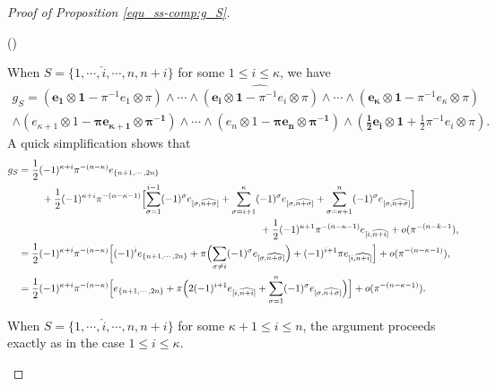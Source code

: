 \documentclass[pdflatex,sn-mathphys-num]{sn-jnl}%
\theoremstyle{thmstyleone}%
\theoremstyle{thmstyletwo}%
\numberwithin{equation}{subsection}
\theoremstyle{thmstylethree}%
\newcommand{\wh}{\widehat}
\newenvironment{altenumerate}
	{\begin{list}
			{(\theenumi) }
			{\usecounter{enumi}
				\setlength{\labelwidth}{0pt}
				\setlength{\labelsep}{0pt}
				\setlength{\leftmargin}{0pt}
				\setlength{\itemsep}{\the\smallskipamount}
				\renewcommand{\theenumi}{\roman{enumi}}
		}}
		{\end{list}}
\begin{document}
\begin{proof}[Proof of Proposition \ref{equ_ss-comp:g_S}]
\begin{altenumerate}
	\item When $S=\{1,\cdots,\wh{i},\cdots,n,n+i\}$ for some $1\leq i\leq \kappa$, we have
\begin{multline*}
g_S=(\mathbf{e_1\otimes 1}-\pi^{-1}e_1\otimes \pi)\wedge\cdots\wedge \wh{(\mathbf{e_i\otimes 1}-\pi^{-1}e_i\otimes \pi)}\wedge\cdots\wedge(\mathbf{e_\kappa\otimes 1}-\pi^{-1}e_\kappa\otimes \pi)\\
\wedge(e_{\kappa+1}\otimes 1-\mathbf{\pi e_{\kappa+1}\otimes \pi^{-1}})\wedge\cdots\wedge(e_n\otimes 1-\mathbf{\pi e_n\otimes \pi^{-1}})\wedge (\mathbf{\frac{1}{2}e_i\otimes 1}+\frac{1}{2}\pi^{-1}e_i\otimes \pi).
\end{multline*}
 A quick simplification shows that 
	\begin{align*}
		g_S={}   &\frac{1}{2}(-1)^{\kappa+i}\pi^{-(n-\kappa)}e_{\{n+1,\cdots,2n\}}\\
		&\quad+\frac{1}{2}(-1)^{\kappa+i}\pi^{-(n-\kappa-1)}\Bigl[\sum_{\sigma=1}^{i-1}(-1)^{\sigma}e_{[\sigma,\wh{n+\sigma}]}+\sum_{\sigma=i+1}^{\kappa}(-1)^{\sigma}e_{[\sigma,\wh{n+\sigma}]}+\sum_{\sigma=\kappa+1}^{n}(-1)^{\sigma}e_{[\sigma,\wh{n+\sigma}]}\Bigr]\\
		&\hspace{8cm}
		+\frac{1}{2}(-1)^{\kappa+1}\pi^{-(n-\kappa-1)}e_{[i,\wh{n+i}]}+o(\pi^{-(n-k-1}),\\
        ={}&
        \frac{1}{2}(-1)^{\kappa+i}\pi^{-(n-\kappa)}\Bigl[
        (-1)^ie_{\{n+1,\cdots,2n\}}+\pi\Bigl(\sum_{\sigma\neq i}(-1)^\sigma e_{[\sigma,\wh{n+\sigma}]}\Bigr)+(-1)^{i+1}\pi e_{[i,\wh{n+i}]}
        \Bigr]+o(\pi^{-(n-\kappa-1)}),\\
        ={}&\frac{1}{2}(-1)^{\kappa+i}\pi^{-(n-\kappa)}\Bigl[
        e_{\{n+1,\cdots,2n\}}+\pi\Bigl(
        2(-1)^{i+1}e_{[i,\wh{n+i}]}+\sum_{\sigma=1}^n(-1)^\sigma e_{[\sigma,\wh{n+\sigma}]}
        \Bigr)
        \Bigr]+o(\pi^{-(n-\kappa-1)}).
	\end{align*}
				
	\item When $S=\{1,\cdots,\wh{i},\cdots,n,n+i\}$ for some $\kappa+1\leq i \leq n$, the argument proceeds exactly as in the case $1 \leq i \leq \kappa$.
					

\end{altenumerate}
\end{proof}
\end{document}
